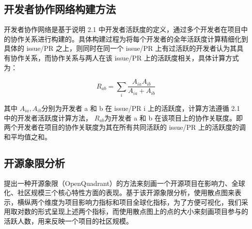 \subsection{​开发者协作网络构建方法}
开发者协作网络是基于说明 2.1 中开发者活跃度的定义，通过多个开发者在项目中的协作关系进行构建的。具体构建过程为将每个开发者的全年活跃度计算精细化到具体的 issue/PR 之上，则同时在同一个 issue/PR 上有过活跃的开发者认为其具有协作关系，而协作关系与两人在该 issue/PR 上的活跃度相关，具体计算方式为：

$$ R_{ab}=\sum_{i}{\frac{A_{ia}A_{ib}}{A_{ia}+A_{ib}}} $$

其中 $ A_{ia}, A_{ib} $分别为开发者 a 和 b 在 issue/PR i 上的活跃度，计算方法遵循 2.1 中的开发者活跃度计算方法， $ R_{ab} $为开发者 a 和 b 在该项目上的协作关联度。即两个开发者在项目的协作关联度为其在所有共同活跃的 issue/PR 上的活跃度的调和平均值之和。
\subsection{开源象限分析}
\par 提出一种开源象限（OpenQuadrant）的方法来刻画一个开源项目在影响力、全球化、社区规模三个核心特性方面的表现。基于该开源象限分析，使用散点图来表示，横纵两个维度为项目影响力指标和项目全球化指标，为了方便可视化，我们采用取对数的形式呈现上述两个指标，而使用散点图上的点的大小来刻画项目参与的活跃人数，用来反映一个项目的社区规模。\cite{vasilescu2015quality}

